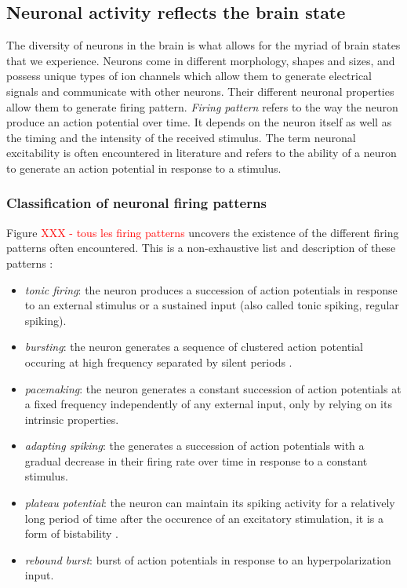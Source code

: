  


\subsection{Neuronal activity reflects the brain state}

The diversity of neurons in the brain is what allows for the myriad of brain states that we experience. Neurons come in different morphology, shapes and sizes, and possess unique types of ion channels which allow them to generate electrical signals and communicate with other neurons. Their different neuronal properties allow them to generate firing pattern. \textit{Firing pattern} refers to the way the neuron produce an action potential over time.  It depends on the neuron itself as well as the timing and the intensity of the received stimulus. The term neuronal excitability is often encountered in literature and refers to the ability of a neuron to generate an action potential in response to a stimulus.



\subsubsection{Classification of neuronal firing patterns}
Figure \textcolor{red}{XXX - tous les firing patterns} uncovers the existence of the different firing patterns often encountered. This is a non-exhaustive list and description of these patterns \citep{komendantov_quantitative_2019, izhikevich_classification_2004}:
\begin{itemize}
    \item \textit{tonic firing}: the neuron produces a succession of action potentials in response to an external stimulus or a sustained input (also called tonic spiking, regular spiking).
    \item \textit{bursting}: the neuron generates a sequence of clustered action potential occuring at high frequency separated by silent periods \citep{kucyi_neural_2017}.
    \item \textit{pacemaking}: the neuron generates a constant succession of action potentials at a fixed frequency independently of any external input, only by relying on its intrinsic properties.
    \item \textit{adapting spiking}: the generates a succession of action potentials with a gradual decrease in their firing rate over time in response to a constant stimulus.
    \item \textit{plateau potential}: the neuron can maintain its spiking activity for a relatively long period of time after the occurence of an excitatory stimulation, it is a form of bistability \citep{marder_plateau_2003}.
    \item \textit{rebound burst}: burst of action potentials in response to an hyperpolarization input.\\
\end{itemize} 

